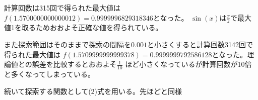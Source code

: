 \documentclass[a4paper,11pt,dvipdfmx]{jsarticle}
\begin{document}
計算回数は315回で得られた最大値は$f(1.5700000000000012)=0.9999996829318346$となった。
$\sin(x)$は$\frac{\pi}{2}$で最大値1を取るためおおよそ正確な値を得られている。

また探索範囲はそのままで探索の間隔を$0.001$と小さくすると計算回数3142回で得られた最大値は
$f(1.5709999999999378)=0.9999999792586128$となった。理論値との誤差を比較するとおおよそ$\frac{1}{10}$
ほど小さくなっているが計算回数が10倍と多くなってしまっている。

続いて探索する関数として(2)式を用いる。先ほどと同様






\end{document}
